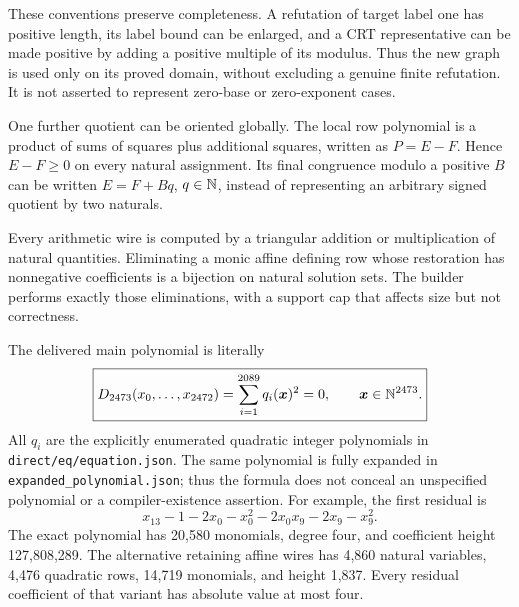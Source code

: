 These conventions preserve completeness. A refutation of target label
one has positive length, its label bound can be enlarged, and a CRT
representative can be made positive by adding a positive multiple of its
modulus. Thus the new graph is used only on its proved domain, without
excluding a genuine finite refutation. It is not asserted to represent
zero-base or zero-exponent cases.

One further quotient can be oriented globally. The local row polynomial
is a product of sums of squares plus additional squares, written as
$P=E-F$. Hence $E-F\ge0$ on every natural assignment. Its final
congruence modulo a positive $B$ can be written $E=F+Bq$, $q\in\mathbb N$,
instead of representing an arbitrary signed quotient by two naturals.

Every arithmetic wire is computed by a triangular addition or
multiplication of natural quantities. Eliminating a monic affine defining
row whose restoration has nonnegative coefficients is a bijection on
natural solution sets. The builder performs exactly those eliminations,
with a support cap that affects size but not correctness.

The delivered main polynomial is literally
\begin{equation}
 \boxed{D_{2473}(x_0,\ldots,x_{2472})
   =\sum_{i=1}^{2089}q_i(\boldsymbol{x})^2=0,
   \qquad\boldsymbol{x}\in\mathbb N^{2473}.}\label{eq:directquartic}
\end{equation}
All $q_i$ are the explicitly enumerated quadratic integer polynomials in
\texttt{direct/eq/equation.json}. The same polynomial is fully expanded
in \texttt{expanded\_polynomial.json}; thus the formula does not conceal
an unspecified polynomial or a compiler-existence assertion. For example,
the first residual is
\[
 x_{13}-1-2x_0-x_0^2-2x_0x_9-2x_9-x_9^2.
\]
The exact polynomial has 20,580 monomials, degree four, and coefficient
height 127,808,289. The alternative retaining affine wires has 4,860
natural variables, 4,476 quadratic rows, 14,719 monomials, and height
1,837. Every residual coefficient of that variant has absolute value
at most four.

